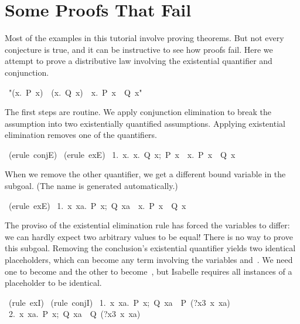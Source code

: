 
\section{Some Proofs That Fail}

%
Most of the examples in this tutorial involve proving theorems.  But not every 
conjecture is true, and it can be instructive to see how  
proofs fail. Here we attempt to prove a distributive law involving 
the existential quantifier and conjunction. 
\begin{isabelle}
\ "({\isasymexists}x.\ P\ x)\ \isasymand\ 
({\isasymexists}x.\ Q\ x)\ \isasymLongrightarrow\ {\isasymexists}x.\ P\ x\
\isasymand\ Q\ x"
\end{isabelle}
The first steps are  routine.  We apply conjunction elimination to break
the assumption into two existentially quantified assumptions. 
Applying existential elimination removes one of the quantifiers. 
\begin{isabelle}
\ (erule\ conjE)\isanewline
\isacommand{apply}\ (erule\ exE)\isanewline
\ 1.\ \isasymAnd x.\ \isasymlbrakk{\isasymexists}x.\ Q\ x;\ P\ x\isasymrbrakk\ \isasymLongrightarrow\ {\isasymexists}x.\ P\ x\ \isasymand\ Q\ x
\end{isabelle}
%
When we remove the other quantifier, we get a different bound 
variable in the subgoal.  (The name  is generated automatically.)
\begin{isabelle}
\isacommand{apply}\ (erule\ exE)\isanewline
\ 1.\ \isasymAnd x\ xa.\ \isasymlbrakk P\ x;\ Q\ xa\isasymrbrakk\
\isasymLongrightarrow\ {\isasymexists}x.\ P\ x\ \isasymand\ Q\ x
\end{isabelle}
The proviso of the existential elimination rule has forced the variables to
differ: we can hardly expect two arbitrary values to be equal!  There is
no way to prove this subgoal.  Removing the
conclusion's existential quantifier yields two
identical placeholders, which can become  any term involving the variables 
and~\isa{xa}.  We need one to become \isa{x}
and the other to become~\isa{xa}, but Isabelle requires all instances of a
placeholder to be identical. 
\begin{isabelle}
\ (rule\ exI)\isanewline
\isacommand{apply}\ (rule\ conjI)\isanewline
\ 1.\ \isasymAnd x\ xa.\ \isasymlbrakk P\ x;\ Q\ xa\isasymrbrakk\
\isasymLongrightarrow\ P\ (?x3\ x\ xa)\isanewline
\ 2.\ \isasymAnd x\ xa.\ \isasymlbrakk P\ x;\ Q\ xa\isasymrbrakk\ \isasymLongrightarrow\ Q\ (?x3\ x\ xa)
\end{isabelle}
